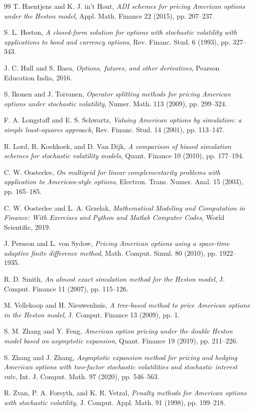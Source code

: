 \documentclass[]{interact}
\theoremstyle{plain}%
\theoremstyle{definition}
\theoremstyle{remark}
\begin{document}
\begin{thebibliography}{99}
T. Haentjens and K. J. in’t Hout, \emph{ADI schemes for pricing American options under the Heston model}, Appl. Math. Finance 22 (2015), pp. 207--237.

S. L. Heston, \emph{A closed-form solution for options with stochastic volatility with applications to bond and currency options}, Rev. Financ. Stud. 6 (1993), pp. 327--343.

J. C. Hull and S. Basu, \emph{Options, futures, and other derivatives}, Pearson Education India, 2016.

S. Ikonen and J. Toivanen, \emph{Operator splitting methods for pricing American options under stochastic volatility}, Numer. Math. 113 (2009), pp. 299--324.

F. A. Longstaff and E. S. Schwartz, \emph{Valuing American options by simulation: a simple least-squares approach}, Rev. Financ. Stud. 14 (2001), pp. 113--147.

R. Lord, R. Koekkoek, and D. Van Dijk, \emph{A comparison of biased simulation schemes for stochastic volatility models}, Quant. Finance 10 (2010), pp. 177--194.

C. W. Oosterlee, \emph{On multigrid for linear complementarity problems with application to American-style options}, Electron. Trans. Numer. Anal. 15 (2003), pp. 165--185.

C. W. Oosterlee and L. A. Grzelak, \emph{Mathematical Modeling and Computation in Finance: With Exercises and Python and Matlab Computer Codes}, World Scientific, 2019.

J. Persson and L. von Sydow, \emph{Pricing American options using a space-time adaptive finite difference method}, Math. Comput. Simul. 80 (2010), pp. 1922--1935.

R. D. Smith, \emph{An almost exact simulation method for the Heston model}, J. Comput. Finance 11 (2007), pp. 115--126.

M. Vellekoop and H. Nieuwenhuis, \emph{A tree-based method to price American options in the Heston model}, J. Comput. Finance 13 (2009), pp. 1.

S. M. Zhang and Y. Feng, \emph{American option pricing under the double Heston model based on asymptotic expansion}, Quant. Finance 19 (2019), pp. 211--226.

S. Zhang and J. Zhang, \emph{Asymptotic expansion method for pricing and hedging American options with two-factor stochastic volatilities and stochastic interest rate}, Int. J. Comput. Math. 97 (2020), pp. 546--563.

R. Zvan, P. A. Forsyth, and K. R. Vetzal, \emph{Penalty methods for American options with stochastic volatility}, J. Comput. Appl. Math. 91 (1998), pp. 199--218.



\end{thebibliography}
\end{document}
